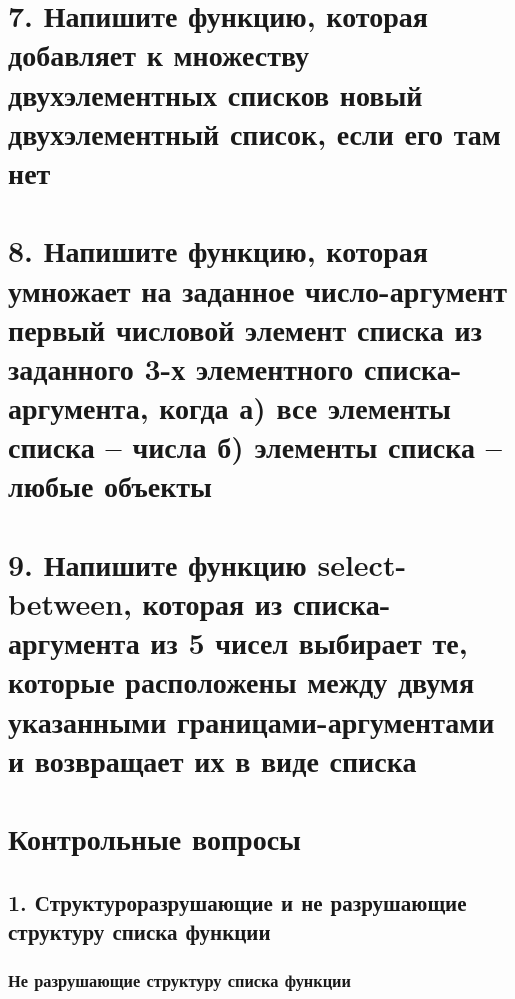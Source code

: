 

\section*{7. Напишите функцию, которая добавляет к множеству двухэлементных списков новый двухэлементный список, если его там нет}


	
	\section*{8. Напишите функцию, которая умножает на заданное число-аргумент первый числовой элемент списка из заданного 3-х элементного списка-аргумента, когда а) все элементы списка -- числа б) элементы списка -- любые объекты}


	
	\section*{9. Напишите функцию select-between, которая из списка-аргумента из 5 чисел выбирает те, которые расположены между двумя указанными границами-аргументами и возвращает их в виде списка}


	
\section*{Контрольные вопросы}

\subsection*{1. Структуроразрушающие и не разрушающие структуру списка функции}

\subsubsection{Не разрушающие структуру списка функции}

